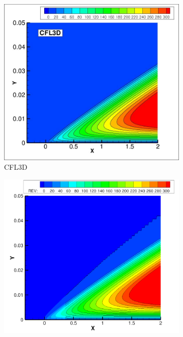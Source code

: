 \begin{figure}[ht!]
\centering
\begin{subfigure}{.32\textwidth}
  \centering
  \includegraphics[width=1.0\textwidth]{figs/flat/mut_contours_cfl3d.jpg}
  \caption{CFL3D}
\end{subfigure}%
\begin{subfigure}{.32\textwidth}
  \centering
  \includegraphics[width=1.0\textwidth]{figs/flat/rev_sa.png}

\end{subfigure}
\end{figure}
